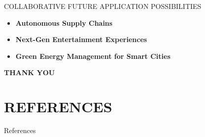 \documentclass[aspectratio=169,xcolor=dvipsnames]{beamer}
\begin{document}
\begin{frame}{COLLABORATIVE FUTURE APPLICATION POSSIBILITIES}
    \begin{itemize}
        \item \textbf{Autonomous Supply Chains}
        \item \textbf{Next-Gen Entertainment Experiences}
        \item \textbf{Green Energy Management for Smart Cities}
    \end{itemize}
\end{frame}

\begin{frame}
    \Huge{\centerline{\textbf{THANK YOU}}}
\end{frame}

\section{REFERENCES}

\begin{frame}{References}
    \tiny
    \nocite{*} 
     
     
\end{frame}
\end{document}
